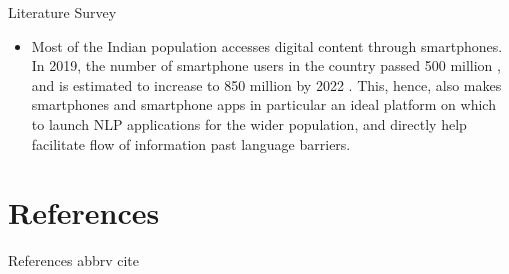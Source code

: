 \documentclass{beamer}
\begin{document}
\begin{frame}[allowframebreaks]{Literature Survey}
\begin{itemize}
		\item Most of the Indian population accesses digital content through smartphones. In 2019, the number of smartphone users in the country passed 500 million \cite{news18_2020}, and is estimated to increase to 850 million by 2022 \cite{www.ettelecom.com_2020}. This, hence, also makes smartphones and smartphone apps in particular an ideal platform on which to launch NLP applications for the wider population, and directly help facilitate flow of information past language barriers.
		\end{itemize} 
	\end{frame}

\section{References}
\begin{frame}[allowframebreaks]{References}
	 {abbrv}
	 {cite}
\end{frame}
	
\end{document}
